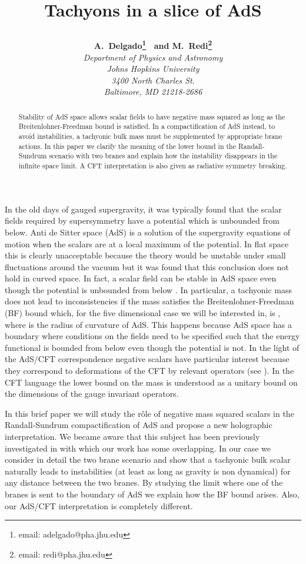 \documentclass[a4paper,12pt,dvips]{article}
\title{
\vspace{1cm}
%
\Large\textbf{Tachyons in a slice of AdS}
%
\vspace*{.5cm}
\author{\large \textbf{
A.~Delgado\footnote{email: adelgado@pha.jhu.edu}
\mbox{  }and M.~Redi\footnote{email: redi@pha.jhu.edu}}\\
\emph{
Department of Physics and Astronomy} \\
\emph{Johns Hopkins University} \\
\emph{3400 North Charles St}. \\
\emph{Baltimore, MD 21218-2686}}}
\date{}
\begin{document}
\maketitle
\thispagestyle{empty}
\vspace*{.5cm}

\begin{abstract}

 Stability of AdS space allows scalar fields to have negative
 mass squared as long as the Breitenlohner-Freedman bound is
 satisfied. In a compactification
 of AdS instead, to avoid instabilities, a tachyonic bulk mass
 must be supplemented by appropriate brane actions.
 In this paper we clarify the meaning of the lower bound in the
 Randall-Sundrum scenario with two branes
 and explain how the instability disappears in the
 infinite space limit. A CFT
 interpretation is also given as radiative symmetry breaking.
\end{abstract}

\newpage
\renewcommand{\thepage}{\arabic{page}}
\setcounter{page}{1}

In the old days of gauged supergravity, it was typically found
that the scalar fields required by supersymmetry have a potential
which is unbounded from below. Anti de Sitter space (AdS) is a
solution of the supergravity equations of motion when the scalars
are at a local maximum of the potential. In flat space this is
clearly unacceptable because the theory would be unstable under
small fluctuations around the vacuum but it was found that this
conclusion does not hold in curved space. In fact, a scalar field
can be stable in AdS space even though the potential is unbounded
from below \cite{freedman}. In particular, a tachyonic mass does
not lead to inconsistencies if the mass satisfies the
Breitenlohner-Freedman (BF) bound which, for the five dimensional
case we will be interested in, is \coordHE{}, where \coordHE{} is
the radius of curvature of AdS\coordHE{}. This happens because AdS space
has a boundary where conditions on the fields need to be specified
such that the energy functional is bounded from below even though
the potential is not. In the light of the AdS/CFT correspondence
negative scalars have particular interest because they correspond
to deformations of the CFT by relevant operators (see
\cite{maldacena}). In the CFT language the lower bound on the mass
is understood as a unitary bound on the dimensions of the gauge
invariant operators.

In this brief paper we will study the r\^ole of negative mass
squared scalars in the Randall-Sundrum compactification of AdS and
propose a new holographic interpretation. We became aware that
this subject has been previously investigated in \cite{japanese}
with which our work has some overlapping. In our case we consider
in detail the two brane scenario and show that a tachyonic bulk
scalar naturally leads to instabilities (at least as long as
gravity is non dynamical) for any distance between the two branes.
By studying the limit where one of the branes is sent to the
boundary of AdS we explain how the BF bound arises. Also, our
AdS/CFT interpretation is completely different.
\end{document}
